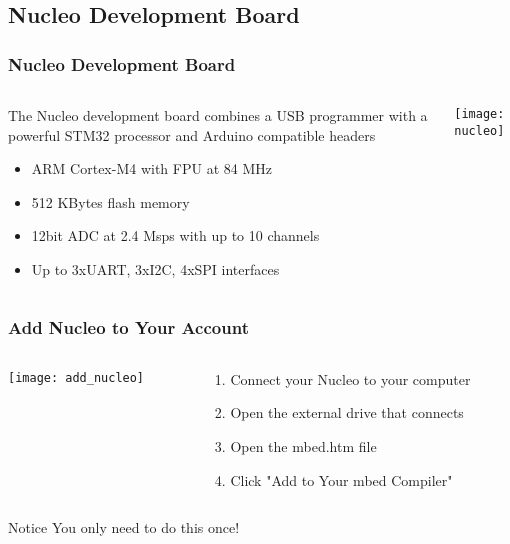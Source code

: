 \subsection{Nucleo Development Board}
\begin{frame}
	\frametitle{Nucleo Development Board}
	\begin{columns}[T]
		\begin{column}{0.5\textwidth}
			The Nucleo development board combines a USB programmer with a powerful STM32 processor and Arduino compatible headers
			\begin{itemize}
				\item ARM Cortex-M4 with FPU at 84 MHz
				\item 512 KBytes flash memory
				\item 12bit ADC at 2.4 Msps with up to 10 channels
				\item Up to 3xUART, 3xI2C, 4xSPI interfaces
			\end{itemize}
		\end{column}
		\begin{column}{0.5\textwidth}
			\texttt{[image: nucleo]}
		\end{column}
	\end{columns}
\end{frame}

\begin{frame}
	\frametitle{Add Nucleo to Your Account}
	\begin{columns}[c]
		\begin{column}{0.5\textwidth}
			\texttt{[image: add\_nucleo]}
		\end{column}
		\begin{column}{0.5\textwidth}
			\begin{enumerate}
				\item Connect your Nucleo to your computer
				\item Open the external drive that connects
				\item Open the mbed.htm file
				\item Click "Add to Your mbed Compiler"
			\end{enumerate}
		\end{column}
	\end{columns}
	\begin{block}{Notice}
		You only need to do this once!
	\end{block}
\end{frame}

